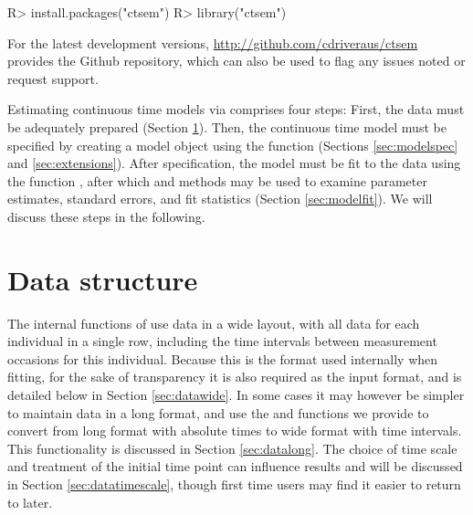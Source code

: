 \documentclass[nojss]{jss}\usepackage[]{graphicx}\usepackage[]{color}
\begin{document}
\begin{Schunk}
\begin{Sinput}
R> install.packages("ctsem")
R> library("ctsem")
\end{Sinput}
\end{Schunk}

For the latest development versions, \url{http://github.com/cdriveraus/ctsem} provides the Github repository, which can also be used to flag any issues noted or request support.

Estimating continuous time models via  comprises four steps: First, the data must be adequately prepared (Section \ref{sec:datastructure}). Then, the continuous time model must be specified by creating a  model object using the function  (Sections \ref{sec:modelspec} and \ref{sec:extensions}). After specification, the model must be fit to the data using the function , after which  and  methods may be used to examine parameter estimates, standard errors, and fit statistics (Section \ref{sec:modelfit}). We will discuss these steps in the following.  

\section{Data structure} \label{sec:datastructure}\nopagebreak
The internal functions of  use data in a wide layout, with all data for each individual in a single row, including the time intervals between measurement occasions for this individual. Because this is the format used internally when fitting, for the sake of transparency it is also required as the input format, and is detailed below in Section \ref{sec:datawide}. In some cases it may however be simpler to maintain data in a long format, and use the  and  functions we provide to convert from long format with absolute times to wide format with time intervals. This functionality is discussed in Section \ref{sec:datalong}. The choice of time scale and treatment of the initial time point can influence results and will be discussed in Section \ref{sec:datatimescale}, though first time users may find it easier to return to later.
\end{document}
